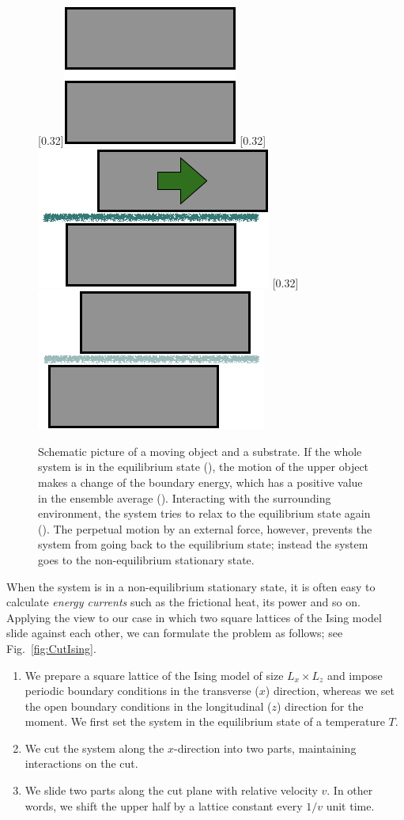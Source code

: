 \begin{figure}[htbp]
	\centering
	\subcaptionbox{\label{subcap:schemNESS1}}[0.32\linewidth]{\includegraphics[height=0.15\linewidth]{schemNESS1.png}}
	\subcaptionbox{\label{subcap:schemNESS2}}[0.32\linewidth]{\includegraphics[height=0.15\linewidth]{schemNESS2.png}}
	\subcaptionbox{\label{subcap:schemNESS3}}[0.32\linewidth]{\includegraphics[height=0.15\linewidth]{schemNESS3.png}}
	
	\caption{Schematic picture of a moving object and a substrate. If the whole system is in the equilibrium state (), the motion of the upper object makes a change of the boundary energy, which has a positive value in the ensemble average (). Interacting with the surrounding environment, the system tries to relax to the equilibrium state again (). The perpetual motion by an external force, however, prevents the system from going back to the equilibrium state; instead the system goes to the non-equilibrium stationary state.}
	\label{fig:schemNESS}
\end{figure}

When the system is in a non-equilibrium stationary state, it is often easy to calculate \textit{energy currents} such as the frictional heat, its power and so on. Applying the view to our case in which two square lattices of the Ising model slide against each other, we can formulate the problem as follows; see Fig.~\ref{fig:CutIsing}.
\begin{enumerate}
	\item We prepare a square lattice of the Ising model of size $L_{x}\times L_{z}$ and impose periodic boundary conditions in the transverse ($x$) direction, whereas we set the open boundary conditions in the longitudinal ($z$) direction for the moment. We first set the system in the equilibrium state of a temperature $T$.
	\item We cut the system along the $x$-direction into two parts, maintaining interactions on the cut.
	\item We slide two parts along the cut plane with relative velocity $v$. In other words, we shift the upper half by a lattice constant every $1/v$ unit time. 
\end{enumerate}

